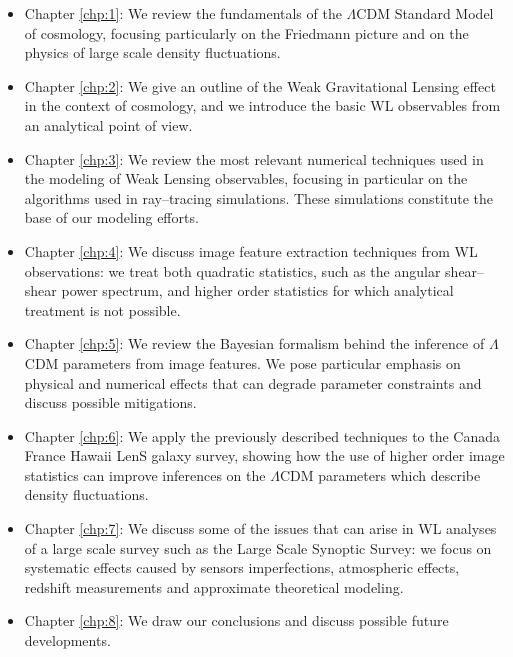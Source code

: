 \begin{itemize}

	\item Chapter \ref{chp:1}: We review the fundamentals of the $\Lambda$CDM Standard Model of cosmology, focusing particularly on the Friedmann picture and on the physics of large scale density fluctuations.
	
	\item Chapter \ref{chp:2}: We give an outline of the Weak Gravitational Lensing effect in the context of cosmology, and we introduce the basic WL observables from an analytical point of view.
	
	\item Chapter \ref{chp:3}: We review the most relevant numerical techniques used in the modeling of Weak Lensing observables, focusing in particular on the algorithms used in ray--tracing simulations. These simulations constitute the base of our modeling efforts.  
	
	\item Chapter \ref{chp:4}: We discuss image feature extraction techniques from WL observations: we treat both quadratic statistics, such as the angular shear--shear power spectrum, and higher order statistics for which analytical treatment is not possible.
	
	\item Chapter \ref{chp:5}: We review the Bayesian formalism behind the inference of $\Lambda$CDM parameters from image features. We pose particular emphasis on physical and numerical effects that can degrade parameter constraints and discuss possible mitigations.
	
	\item Chapter \ref{chp:6}: We apply the previously described techniques to the Canada France Hawaii LenS galaxy survey, showing how the use of higher order image statistics can improve inferences on the $\Lambda$CDM parameters which describe density fluctuations. 
	
	\item Chapter \ref{chp:7}: We discuss some of the issues that can arise in WL analyses of a large scale survey such as the Large Scale Synoptic Survey: we focus on systematic effects caused by sensors imperfections, atmospheric effects, redshift measurements and approximate theoretical modeling.
	
	\item Chapter \ref{chp:8}: We draw our conclusions and discuss possible future developments.

\end{itemize}